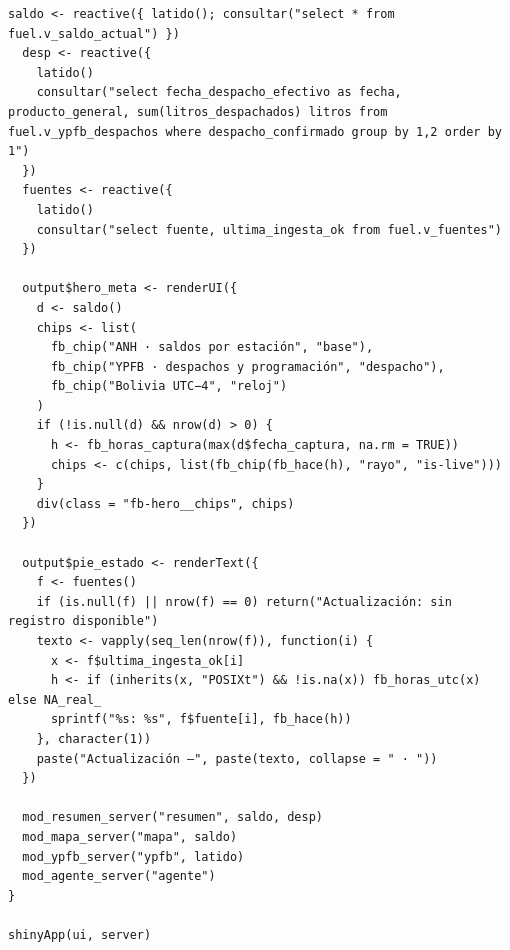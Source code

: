 \begin{lstlisting}[style=anexoR]
  saldo <- reactive({ latido(); consultar("select * from fuel.v_saldo_actual") })
  desp <- reactive({
    latido()
    consultar("select fecha_despacho_efectivo as fecha, producto_general, sum(litros_despachados) litros from fuel.v_ypfb_despachos where despacho_confirmado group by 1,2 order by 1")
  })
  fuentes <- reactive({
    latido()
    consultar("select fuente, ultima_ingesta_ok from fuel.v_fuentes")
  })

  output$hero_meta <- renderUI({
    d <- saldo()
    chips <- list(
      fb_chip("ANH · saldos por estación", "base"),
      fb_chip("YPFB · despachos y programación", "despacho"),
      fb_chip("Bolivia UTC−4", "reloj")
    )
    if (!is.null(d) && nrow(d) > 0) {
      h <- fb_horas_captura(max(d$fecha_captura, na.rm = TRUE))
      chips <- c(chips, list(fb_chip(fb_hace(h), "rayo", "is-live")))
    }
    div(class = "fb-hero__chips", chips)
  })

  output$pie_estado <- renderText({
    f <- fuentes()
    if (is.null(f) || nrow(f) == 0) return("Actualización: sin registro disponible")
    texto <- vapply(seq_len(nrow(f)), function(i) {
      x <- f$ultima_ingesta_ok[i]
      h <- if (inherits(x, "POSIXt") && !is.na(x)) fb_horas_utc(x) else NA_real_
      sprintf("%s: %s", f$fuente[i], fb_hace(h))
    }, character(1))
    paste("Actualización —", paste(texto, collapse = " · "))
  })

  mod_resumen_server("resumen", saldo, desp)
  mod_mapa_server("mapa", saldo)
  mod_ypfb_server("ypfb", latido)
  mod_agente_server("agente")
}

shinyApp(ui, server)
\end{lstlisting}

